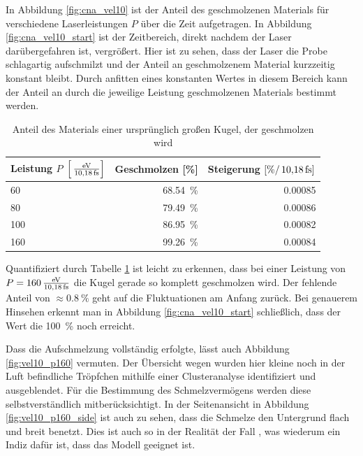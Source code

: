 		In Abbildung \ref{fig:cna_vel10} ist der Anteil des geschmolzenen Materials für
		verschiedene Laserleistungen $P$ über die Zeit aufgetragen. In Abbildung
		\ref{fig:cna_vel10_start} ist der Zeitbereich, direkt nachdem der Laser darübergefahren
		ist, vergrößert.
		Hier ist zu sehen, dass der Laser die Probe schlagartig aufschmilzt und der Anteil an
		geschmolzenem Material kurzzeitig konstant bleibt. Durch anfitten eines konstanten Wertes
		in diesem Bereich kann der Anteil an durch die jeweilige Leistung geschmolzenen Materials
		bestimmt werden.

		\begin{table}[!ht]
			\centering
			\caption{Anteil des Materials einer ursprünglich großen Kugel,
			der geschmolzen wird}
			\begin{tabular}{l | r | r}
				Leistung $P$ $\left[\powerunit\right]$
					&	Geschmolzen [\%]
					&	Steigerung $\left[\si{\percent\per\timeunit}\right]$
					\\\hline
				60	&	\SI{68.54}{\percent}	&	0.00085	\\
				80	&	\SI{79.49}{\percent}	&	0.00086	\\
				100	&	\SI{86.95}{\percent}	&	0.00082	\\
				160	&	\SI{99.26}{\percent}	&	0.00084
			\end{tabular}
			\label{tab:vel10_start}
		\end{table}

		Quantifiziert durch Tabelle \ref{tab:vel10_start} ist leicht zu erkennen, dass bei einer
		Leistung von $P = \powerunit[160]$ die Kugel gerade so komplett geschmolzen wird. Der fehlende
		Anteil von $\approx \SI{0.8}{\percent}$ geht auf die Fluktuationen am Anfang zurück. Bei
		genauerem Hinsehen erkennt man in Abbildung \ref{fig:cna_vel10_start} schließlich, dass
		der Wert die \SI{100}{\percent} noch erreicht.

		Dass die Aufschmelzung vollständig erfolgte, lässt auch Abbildung \ref{fig:vel10_p160}
		vermuten. Der Übersicht wegen wurden hier kleine noch in der Luft befindliche Tröpfchen
		mithilfe einer Clusteranalyse identifiziert und ausgeblendet. Für die Bestimmung des
		Schmelzvermögens werden diese selbstverständlich mitberücksichtigt. In der Seitenansicht
		in Abbildung \ref{fig:vel10_p160_side} ist auch zu sehen, dass die Schmelze den Untergrund
		flach und breit benetzt. Dies ist auch so in der Realität der Fall
		\cite{eskandarisabzi2019defect}, was wiederum ein Indiz dafür ist, dass das Modell
		geeignet ist.

